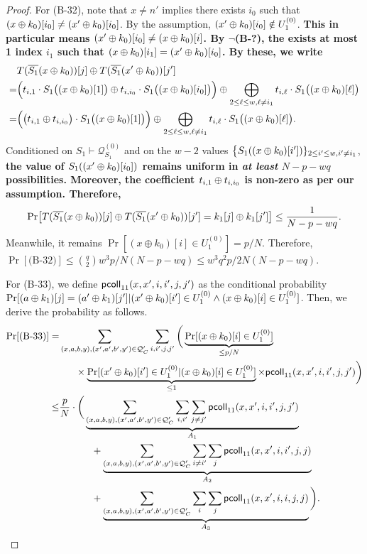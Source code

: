 \begin{proof}
For (B-32), note that $x\neq n'$ implies there exists $i_0$ such that $(x\oplus k_0)[i_0]\neq(x'\oplus k_0)[i_0]$. By the assumption, $(x'\oplus k_0)[i_0]\notin U_1^{(0)}$. \textbf{This in particular means $(x'\oplus k_0)[i_0]\neq(x\oplus k_0)[i]$. By $\neg$(B-?), the exists at most 1 index $i_1$ such that $(x\oplus k_0)[i_1]=(x'\oplus k_0)[i_0]$. By these, we write}
%
\begin{align*}
&  T(\overline{S_1}(x\oplus k_0))[j]\oplus T(\overline{S_1}(x'\oplus k_0))[j']       \\
= &
\Big(t_{i,1}\cdot S_1\big((x\oplus k_0)[1]\big)
\oplus
t_{i,i_0}\cdot S_1\big((x\oplus k_0)[i_0]\big)\Big)
\oplus
\bigoplus_{2\leq\ell\leq w,\ell\neq i_1}t_{i,\ell}\cdot S_1\big((x\oplus k_0)[\ell]\big)     \\
= &
\Big(\big(t_{i,1}\oplus t_{i,i_0}\big)\cdot S_1\big((x\oplus k_0)[1]\big)\Big)
\oplus
\bigoplus_{2\leq\ell\leq w,\ell\neq i_1}t_{i,\ell}\cdot S_1\big((x\oplus k_0)[\ell]\big)    .
\end{align*}
%
Conditioned on $S_1\vdash\mathcal{Q}_{S_1}^{(0)}$ and on the $w-2$ values $\big\{S_1((x\oplus k_0)[i'])\}_{2\leq i'\leq w,i'\neq i_1}$, \textbf{the value of $S_1((x'\oplus k_0)[i_0])$ remains uniform in {\it at least} $N-p-wq$ possibilities. Moreover, the coefficient $t_{i,1}\oplus t_{i,i_0}$ is non-zero as per our assumption. Therefore,}
%
%
%
$${\Pr}\big[T(\overline{S_1}(x\oplus k_0))[j]\oplus T(\overline{S_1}(x'\oplus k_0))[j']=k_1[j]\oplus k_1[j']\big]\leq\frac{1}{N-p-wq}.$$
%
Meanwhile, it remains $\Pr[\left(x \oplus k_{0}\right)[i]\in U_1^{(0)}]=p/N$. Therefore, $\Pr[\text{(B-32)}]\leq{q\choose2}w^3p/N(N-p-wq)\leq w^3q^2p/2N(N-p-wq)$.




For (B-33), we define $\mathsf{pcoll}_{11}(x,x',i,i',j,j')$ as the conditional probability $\Pr[(a\oplus k_1)[j]=(a'\oplus k_1)[j']|   
(x'\oplus k_0)[i']\in U_1^{(0)}\wedge(x\oplus k_0)[i]\in U_1^{(0)}]$. Then, we derive the probability as follows.        {\small
%
\begin{align*}
\Pr[\text{(B-33)}]  
=   &  \sum_{(x,a,b,y),(x',a',b',y')\in\mathcal{Q}_{C}'}\sum_{i,i',j,j'}\bigg(\underbrace{\Pr[(x\oplus k_0)[i]\in U_1^{(0)}]}_{\leq p/N}     \\
   & \ \ \ \ \ \times
	\underbrace{\Pr[(x'\oplus k_0)[i']\in U_1^{(0)}|(x\oplus k_0)[i]\in U_1^{(0)}]}_{\leq1}\times\mathsf{pcoll}_{11}(x,x',i,i',j,j') \bigg)      \\
\leq  &  \frac{p}{N}\cdot\bigg(
\underbrace{\sum_{(x,a,b,y),(x',a',b',y')\in\mathcal{Q}_{C}'}\sum_{i,i'}\sum_{j\neq j'}\mathsf{pcoll}_{11}(x,x',i,i',j,j')}_{A_1}     \\
& \ \ \ \ \ \ \ \ \ \    +  
\underbrace{\sum_{(x,a,b,y),(x',a',b',y')\in\mathcal{Q}_{C}'}\sum_{i\neq i'}\sum_{j}\mathsf{pcoll}_{11}(x,x',i,i',j,j)}_{A_2}      \\ 
& \ \ \ \ \ \ \ \ \ \    +  \underbrace{\sum_{(x,a,b,y),(x',a',b',y')\in\mathcal{Q}_{C}'}\sum_{i}\sum_{j}\mathsf{pcoll}_{11}(x,x',i,i,j,j)}_{A_3}\bigg)     .
\end{align*}
}%
%


\end{proof}

